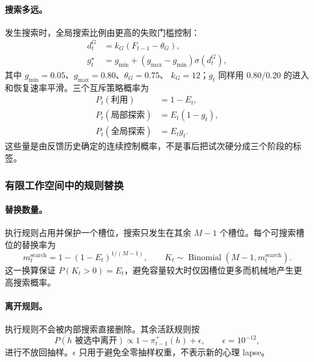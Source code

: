 \paragraph{搜索多远。}
发生搜索时，全局搜索比例由更高的失败门槛控制：
\begin{align}
d_t^G
&=k_G(F_{t-1}-\theta_G),
\nonumber\\
g_t^{\star}
&=g_{\min}+(g_{\max}-g_{\min})\sigma(d_t^G),
\label{eq:m0815-global-target}
\end{align}
其中 $g_{\min}=0.05$、$g_{\max}=0.80$、$\theta_G=0.75$、
$k_G=12$；$g_t$ 同样用 0.80/0.20 的进入和恢复速率平滑。三个互斥策略概率为
\begin{align}
P_t(\text{利用})&=1-E_t,
\nonumber\\
P_t(\text{局部探索})&=E_t(1-g_t),
\nonumber\\
P_t(\text{全局探索})&=E_tg_t.
\label{eq:m0815-strategy-decomposition}
\end{align}
这些量是由反馈历史确定的连续控制概率，不是事后把试次硬分成三个阶段的标签。


\subsubsection{有限工作空间中的规则替换}

\paragraph{替换数量。}
执行规则占用并保护一个槽位，搜索只发生在其余 $M-1$ 个槽位。每个可搜索槽位的替换率为
\begin{equation}
m_t^{\mathrm{search}}
=1-(1-E_t)^{1/(M-1)},
\qquad
K_t\sim\operatorname{Binomial}(M-1,m_t^{\mathrm{search}}).
\label{eq:m0815-protected-search}
\end{equation}
这一换算保证 $P(K_t>0)=E_t$，避免容量较大时仅因槽位更多而机械地产生更高搜索概率。

\paragraph{离开规则。}
执行规则不会被内部搜索直接删除。其余活跃规则按
\begin{equation}
P(h\text{ 被选中离开})
\propto1-\pi_{t-1}^{+}(h)+\epsilon,
\qquad \epsilon=10^{-12},
\label{eq:m0815-drop-rule}
\end{equation}
进行不放回抽样。$\epsilon$ 只用于避免全零抽样权重，不表示新的心理 lapse。

